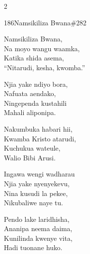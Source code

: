 \begin{multicols}{2}
\begin{hymn}{186}{Namsikiliza Bwana}{\#282}
\begin{stanza}
Namsikiliza Bwana,\\
Na moyo wangu waamka,\\
Katika shida asema,\\
``Nitarudi, kesha, kwomba.''
\end{stanza}
\begin{chorus}
Njia yake ndiyo bora,\\
Nafuata aendako,\\
Ningependa kustahili\\
Mahali aliponipa.
\end{chorus}
\begin{stanza}
Nakumbuka habari hii,\\
Kwamba Kristo atarudi,\\
Kuchukua wateule,\\
Walio Bibi Arusi.
\end{stanza}
\begin{stanza}
Ingawa wengi wadharau\\
Njia yake nyenyekevu,\\
Nina kusudi la pekee,\\
Nikubaliwe naye tu.
\end{stanza}
\begin{stanza}
Pendo lake laridhisha,\\
Ananipa neema daima,\\
Kunilinda kwenye vita,\\
Hadi tuonane huko.
\end{stanza}
\end{hymn}


\end{multicols}
